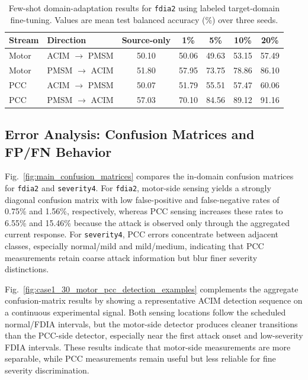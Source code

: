 \documentclass[lettersize,journal]{IEEEtran}
\begin{document}
\begin{table}[t]
\centering
\scriptsize
\caption{Few-shot domain-adaptation results for \texttt{fdia2} using labeled target-domain fine-tuning. Values are mean test balanced accuracy (\%) over three seeds.}
\label{tab:domain_adaptation_anomaly2}
\renewcommand{\arraystretch}{1.15}
\begin{tabular}{l l c c c c c}
\hline
Stream & Direction & Source-only & 1\% & 5\% & 10\% & 20\% \\
\hline
Motor & ACIM $\rightarrow$ PMSM & 50.10 & 50.06 & 49.63 & 53.15 & 57.49 \\
Motor & PMSM $\rightarrow$ ACIM & 51.80 & 57.95 & 73.75 & 78.86 & 86.10 \\
PCC   & ACIM $\rightarrow$ PMSM & 50.07 & 51.79 & 55.51 & 57.47 & 60.06 \\
PCC   & PMSM $\rightarrow$ ACIM & 57.03 & 70.10 & 84.56 & 89.12 & 91.16 \\
\hline
\end{tabular}
\end{table}




\subsection{Error Analysis: Confusion Matrices and FP/FN Behavior}
\label{sec:error_analysis}
Fig.~\ref{fig:main_confusion_matrices} compares the in-domain confusion matrices for \texttt{fdia2} and \texttt{severity4}. For \texttt{fdia2}, motor-side sensing yields a strongly diagonal confusion matrix with low false-positive and false-negative rates of 0.75\% and 1.56\%, respectively, whereas PCC sensing increases these rates to 6.55\% and 15.46\% because the attack is observed only through the aggregated current response. For \texttt{severity4}, PCC errors concentrate between adjacent classes, especially normal/mild and mild/medium, indicating that PCC measurements retain coarse attack information but blur finer severity distinctions.

Fig.~\ref{fig:case1_30_motor_pcc_detection_examples} complements the aggregate confusion-matrix results by showing a representative ACIM detection sequence on a continuous experimental signal. Both sensing locations follow the scheduled normal/FDIA intervals, but the motor-side detector produces cleaner transitions than the PCC-side detector, especially near the first attack onset and low-severity FDIA intervals. These results indicate that motor-side measurements are more separable, while PCC measurements remain useful but less reliable for fine severity discrimination. 
\end{document}
